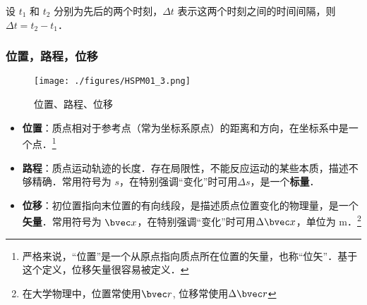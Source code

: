 设 $t_1$ 和 $t_2$ 分别为先后的两个时刻，$\Delta t$ 表示这两个时刻之间的时间间隔，则 $\Delta t = t_2 - t_1$．

\subsubsection{位置，路程，位移}
\begin{figure}[ht]
\centering
\texttt{[image: ./figures/HSPM01\_3.png]}
\caption{位置、路程、位移} \label{HSPM01_fig3}
\end{figure}
\begin{itemize}
\item \textbf{位置}：质点相对于参考点（常为坐标系原点）的距离和方向，在坐标系中是一个点．\footnote{严格来说，“位置”是一个从原点指向质点所在位置的矢量，也称“位矢”．基于这个定义，位移矢量很容易被定义．}
\item \textbf{路程}：质点运动轨迹的长度．存在局限性，不能反应运动的某些本质，描述不够精确．常用符号为 $s$，在特别强调“变化”时可用$\Delta s$，是一个\textbf{标量}．
\item \textbf{位移}：初位置指向末位置的有向线段，是描述质点位置变化的物理量，是一个\textbf{矢量}．常用符号为 $\bvec x$，在特别强调“变化”时可用$\Delta \bvec x$，单位为 $\mathrm{m}$．\footnote{在大学物理中，位置常使用$\bvec r$, 位移常使用$\Delta \bvec r$}
\end{itemize}

